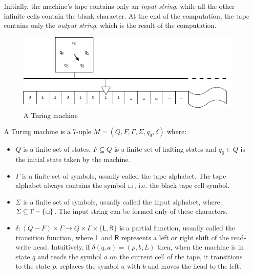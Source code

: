 Initially, the machine's tape contains only an \textit{input string}, while all the other infinite cells contain the blank character. At the end of the computation, the tape contains only the \textit{output string}, which is the result of the computation.

\begin{figure}[H]
    \centering
    \includegraphics[scale=0.525]{resources/images/tm.png}

    \caption{A Turing machine}
\end{figure}

\newpage

\begin{definition}
 A Turing machine is a 7-uple $M = (Q, F, \Gamma, \Sigma, q_0, \delta)$ where:
    \begin{itemize}
        \item $Q$ is a finite set of states, $F \subseteq Q$ is a finite set of halting states and $q_0 \in Q$ is the initial state taken by the machine.
        \item $\Gamma$ is a finite set of symbols, usually called the tape alphabet. The tape alphabet always contains the symbol $\blankchar\,$, i.e. the black tape cell symbol.
        \item $\Sigma$ is a finite set of symbols, usually called the input alphabet, where $\Sigma \subseteq \Gamma - \{\blankchar\}$. The input string can be formed only of these characters.
        \item $\delta : (Q - F) \times \Gamma \to Q \times \Gamma \times \{\mathsf{L}, \mathsf{R}\}$ is a partial function, usually called the transition function, where $\mathsf{L}$ and $\mathsf{R}$ represents a left or right shift of the read-write head. Intuitively, if $\delta(q, a) = (p, b, L)$ then, when the machine is in state $q$ and reads the symbol $a$ on the current cell of the tape, it transitions to the state $p$, replaces the symbol $a$ with $b$ and moves the head to the left.
    \end{itemize}
\end{definition}

